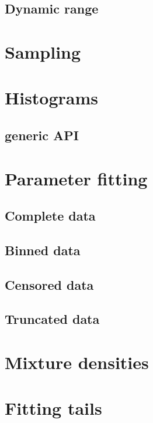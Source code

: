 \subsection{Dynamic range}



\section{Sampling}



\section{Histograms}
\subsection{generic API}




\section{Parameter fitting}

\subsection{Complete data}

\subsection{Binned data}

\subsection{Censored data}

\subsection{Truncated data}


\section{Mixture densities}


\section{Fitting tails}




